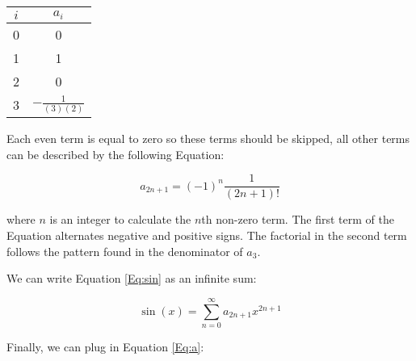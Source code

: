 \documentclass{../../KDHnotes}
\begin{document}
\begin{center}
\begin{tabular}{|c|c|}
\hline 
$i$ & $a_i$ \\ 
\hline 
0 & 0 \\ 
\hline 
1 & 1 \\ 
\hline 
2 & 0 \\ 
\hline 
3 & $-\frac{1}{(3)(2)}$ \\ 
\hline 
\end{tabular} 
\end{center}

Each even term is equal to zero so these terms should be skipped, all other terms can be described by the following Equation:

\begin{equation}
	a_{2n+1} = (-1)^n \frac{1}{(2n+1)!}
	\label{Eq:a}
\end{equation}

where $n$ is an integer to calculate the $n$th non-zero term. The first term of the Equation alternates negative and positive signs. The factorial in the second term follows the pattern found in the denominator of $a_3$.


We can write Equation \ref{Eq:sin} as an infinite sum:

\begin{equation}
	\sin(x) = \sum _{n=0} ^ {\infty} a_{2n+1}x^{2n+1}
\end{equation}

Finally, we can plug in Equation \ref{Eq:a}:



\newpage


\end{document}
